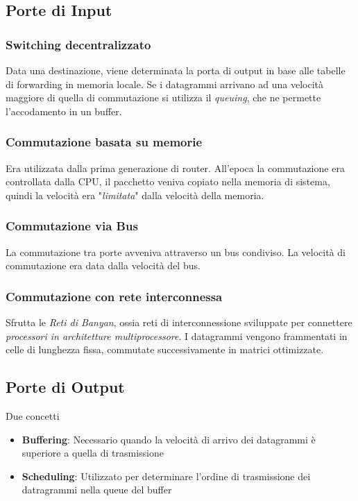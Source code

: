 \documentclass{article}
\begin{document}
        \subsection{Porte di Input}
            \subsubsection{Switching decentralizzato}
                Data una destinazione, viene determinata la porta di output in base alle tabelle di forwarding in memoria locale. Se i datagrammi arrivano ad una velocità maggiore di quella di commutazione si utilizza il \textit{queuing}, che ne permette l'accodamento in un buffer.

            \subsubsection{Commutazione basata su memorie}
                Era utilizzata dalla prima generazione di router. All'epoca la commutazione era controllata dalla CPU, il pacchetto veniva copiato nella memoria di sistema, quindi la velocità era "\textit{limitata}" dalla velocità della memoria.

            \subsubsection{Commutazione via Bus}
                La commutazione tra porte avveniva attraverso un bus condiviso. La velocità di commutazione era data dalla velocità del bus.

            \subsubsection{Commutazione con rete interconnessa}
                Sfrutta le \textit{Reti di Banyan}, ossia reti di interconnessione sviluppate per connettere \textit{processori in architetture multiprocessore}. I datagrammi vengono frammentati in celle di lunghezza fissa, commutate successivamente in matrici ottimizzate.

        \subsection{Porte di Output}
            Due concetti
            \begin{itemize}
                \item \textbf{Buffering}: Necessario quando la velocità di arrivo dei datagrammi è superiore a quella di trasmissione
                \item \textbf{Scheduling}: Utilizzato per determinare l'ordine di trasmissione dei datragrammi nella queue del buffer
            \end{itemize}
\end{document}
